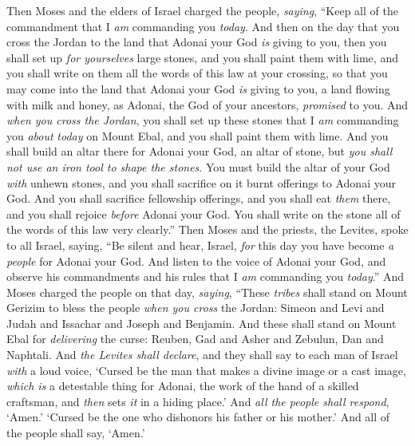 \begin{biblechapter} %
 Then Moses and the elders of Israel charged the people, \textit{saying}, “Keep all of the commandment that I \textit{am} commanding you \textit{today}.
\verse And then on the day that you cross the Jordan to the land that Adonai your God \textit{is} giving to you, then you shall set up \textit{for yourselves} large stones, and you shall paint them with lime,
\verse and you shall write on them all the words of this law at your crossing, so that you may come into the land that Adonai your God \textit{is} giving to you, a land flowing with milk and honey, as Adonai, the God of your ancestors, \textit{promised} to you.
\verse And \textit{when you cross the Jordan}, you shall set up these stones that I \textit{am} commanding you \textit{about} \textit{today} on Mount Ebal, and you shall paint them with lime.
\verse And you shall build an altar there for Adonai your God, an altar of stone, but \textit{you shall not use an iron tool to shape the stones}.
\verse You must build the altar of your God \textit{with} unhewn stones, and you shall sacrifice on it burnt offerings to Adonai your God.
\verse And you shall sacrifice fellowship offerings, and you shall eat \textit{them} there, and you shall rejoice \textit{before} Adonai your God.
\verse You shall write on the stone all of the words of this law very clearly.”
\verse Then Moses and the priests, the Levites, spoke to all Israel, saying, “Be silent and hear, Israel, \textit{for} this day you have become \textit{a people} for Adonai your God.
\verse And listen to the voice of Adonai your God, and observe his commandments and his rules that I \textit{am} commanding you \textit{today}.”
 And Moses charged the people on that day, \textit{saying},
\verse “These \textit{tribes} shall stand on Mount Gerizim to bless the people \textit{when you cross} the Jordan: Simeon and Levi and Judah and Issachar and Joseph and Benjamin.
\verse And these shall stand on Mount Ebal for \textit{delivering} the curse: Reuben, Gad and Asher and Zebulun, Dan and Naphtali.
\verse And \textit{the Levites shall declare}, and they shall say to each man of Israel \textit{with} a loud voice,
\verse ‘Cursed be the man that makes a divine image or a cast image, \textit{which is} a detestable thing for Adonai, the work of the hand of a skilled craftsman, and \textit{then} sets \textit{it} in a hiding place.’ And \textit{all the people shall respond}, ‘Amen.’
\verse ‘Cursed be the one who dishonors his father or his mother.’ And all of the people shall say, ‘Amen.’

\end{biblechapter}
